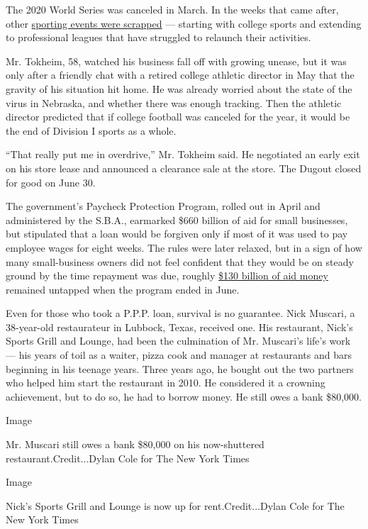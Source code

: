 The 2020 World Series was canceled in March. In the weeks that came
after, other
\href{https://www.nytimes.com/interactive/2020/06/19/sports/100-days-without-sports.html}{sporting
events were scrapped} --- starting with college sports and extending to
professional leagues that have struggled to relaunch their activities.

Mr. Tokheim, 58, watched his business fall off with growing unease, but
it was only after a friendly chat with a retired college athletic
director in May that the gravity of his situation hit home. He was
already worried about the state of the virus in Nebraska, and whether
there was enough tracking. Then the athletic director predicted that if
college football was canceled for the year, it would be the end of
Division I sports as a whole.

``That really put me in overdrive,'' Mr. Tokheim said. He negotiated an
early exit on his store lease and announced a clearance sale at the
store. The Dugout closed for good on June 30.

The government's Paycheck Protection Program, rolled out in April and
administered by the S.B.A., earmarked \$660 billion of aid for small
businesses, but stipulated that a loan would be forgiven only if most of
it was used to pay employee wages for eight weeks. The rules were later
relaxed, but in a sign of how many small-business owners did not feel
confident that they would be on steady ground by the time repayment was
due, roughly
\href{https://www.nytimes.com/2020/06/30/business/paycheck-protection-program-coronavirus.html}{\$130
billion of aid money} remained untapped when the program ended in June.

Even for those who took a P.P.P. loan, survival is no guarantee. Nick
Muscari, a 38-year-old restaurateur in Lubbock, Texas, received one. His
restaurant, Nick's Sports Grill and Lounge, had been the culmination of
Mr. Muscari's life's work --- his years of toil as a waiter, pizza cook
and manager at restaurants and bars beginning in his teenage years.
Three years ago, he bought out the two partners who helped him start the
restaurant in 2010. He considered it a crowning achievement, but to do
so, he had to borrow money. He still owes a bank \$80,000.

Image

Mr. Muscari still owes a bank \$80,000 on his now-shuttered
restaurant.Credit...Dylan Cole for The New York Times

Image

Nick's Sports Grill and Lounge is now up for rent.Credit...Dylan Cole
for The New York Times

